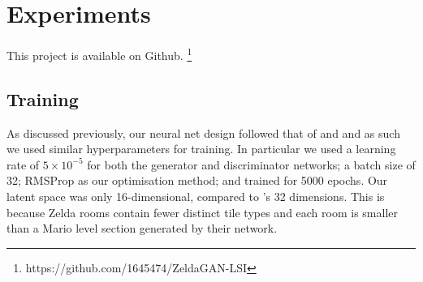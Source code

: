 \documentclass{article}
\begin{document}



\section{Experiments}
This project is available on Github.
\footnote{https://github.com/1645474/ZeldaGAN-LSI}
\subsection{Training}

As discussed previously, our neural net design followed that of \cite{Fontaine2020} and \cite{Volz2018} and as such we used similar hyperparameters for training. In particular we used a learning rate of $5 \times 10^{-5}$ for both the generator and discriminator networks; a batch size of 32; RMSProp as our optimisation method; and trained for 5000 epochs. Our latent space was only 16-dimensional, compared to \cite{Fontaine2020}'s 32 dimensions. This is because Zelda rooms contain fewer distinct tile types and each room is smaller than a Mario level section generated by their network.
\end{document}
